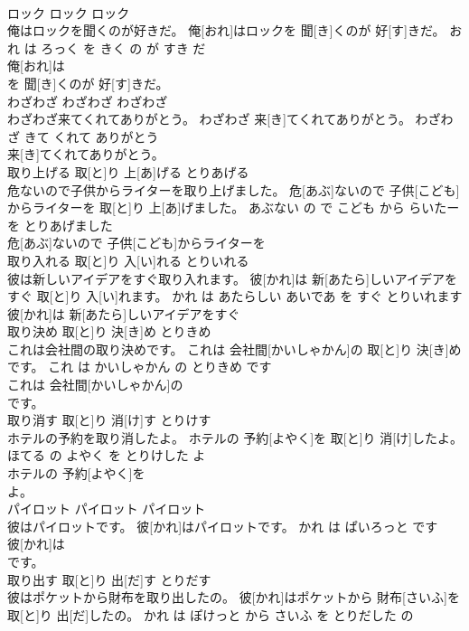 \documentclass[8pt]{extreport}
\begin{document}
\begin{CJK}{UTF8}{min}
\\	ロック	ロック	ロック	
\\	俺はロックを聞くのが好きだ。	俺[おれ]はロックを 聞[き]くのが 好[す]きだ。	おれ は ろっく を きく の が すき だ	
\\	俺[おれ]は
\\	を 聞[き]くのが 好[す]きだ。			
\\	わざわざ	わざわざ	わざわざ	
\\	わざわざ来てくれてありがとう。	わざわざ 来[き]てくれてありがとう。	わざわざ きて くれて ありがとう	
\\	来[き]てくれてありがとう。			
\\	取り上げる	取[と]り 上[あ]げる	とりあげる	
\\	危ないので子供からライターを取り上げました。	危[あぶ]ないので 子供[こども]からライターを 取[と]り 上[あ]げました。	あぶない の で こども から らいたー を とりあげました	
\\	危[あぶ]ないので 子供[こども]からライターを
\\	取り入れる	取[と]り 入[い]れる	とりいれる	
\\	彼は新しいアイデアをすぐ取り入れます。	彼[かれ]は 新[あたら]しいアイデアをすぐ 取[と]り 入[い]れます。	かれ は あたらしい あいであ を すぐ とりいれます	
\\	彼[かれ]は 新[あたら]しいアイデアをすぐ
\\	取り決め	取[と]り 決[き]め	とりきめ	
\\	これは会社間の取り決めです。	これは 会社間[かいしゃかん]の 取[と]り 決[き]めです。	これ は かいしゃかん の とりきめ です	
\\	これは 会社間[かいしゃかん]の
\\	です。			
\\	取り消す	取[と]り 消[け]す	とりけす	
\\	ホテルの予約を取り消したよ。	ホテルの 予約[よやく]を 取[と]り 消[け]したよ。	ほてる の よやく を とりけした よ	
\\	ホテルの 予約[よやく]を
\\	よ。			
\\	パイロット	パイロット	パイロット	
\\	彼はパイロットです。	彼[かれ]はパイロットです。	かれ は ぱいろっと です	
\\	彼[かれ]は
\\	です。			
\\	取り出す	取[と]り 出[だ]す	とりだす	
\\	彼はポケットから財布を取り出したの。	彼[かれ]はポケットから 財布[さいふ]を 取[と]り 出[だ]したの。	かれ は ぽけっと から さいふ を とりだした の	

\end{CJK}
\end{document}
